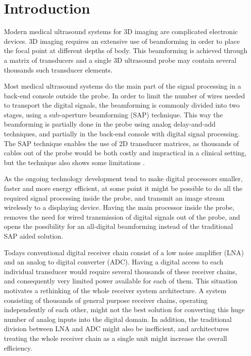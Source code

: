 \chapter{Introduction}
Modern medical ultrasound systems for 3D imaging are complicated electronic devices. 3D imaging requires an extensive use of beamforming in order to place the focal point at different depths of body. This beamforming is achieved through a matrix of transducers and a single 3D ultrasound probe may contain several thousands such transducer elements.

Most medical ultrasound systems do the main part of the signal processing in a back-end console outside the probe. In order to limit the number of wires needed to transport the digital signals, the beamforming is commonly divided into two stages, using a sub-aperture beamforming (SAP) technique. This way the beamforming is partially done in the probe using analog delay-and-add techniques, and partially in the back-end console with digital signal processing. The SAP technique enables the use of 2D transducer matrices, as thousands of cables out of the probe would be both costly and impractical in a clinical setting, but the technique also shows some limitations \cite{haugen_3D_imaging_SAP_pilot}.

As the ongoing technology development tend to make digital processors smaller, faster and more energy efficient, at some point it might be possible to do all the required signal processing inside the probe, and transmit an image stream wirelessly to a displaying device. Having the main processor inside the probe, removes the need for wired transmission of digital signals out of the probe, and opens the possibility for an all-digital beamforming instead of the traditional SAP aided solution.

Todays conventional digital receiver chain consist of a low noise amplifier (LNA) and an analog to digital converter (ADC). Having a digital access to each individual transducer would require several thousands of these receiver chains, and consequently very limited power available for each of them. This situation motivates a rethinking of the whole receiver system architecture. A system consisting of thousands of general purpose receiver chains, operating independently of each other, might not the best solution for converting this huge number of analog inputs into the digital domain. In addition, the traditional division between LNA and ADC might also be inefficient, and architectures treating the whole receiver chain as a single unit might increase the overall efficiency.

